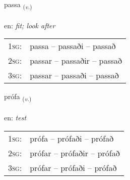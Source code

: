 \documentclass[frontgrid, backgrid]{flacards}\usepackage[]{graphicx}\usepackage[]{color}
\begin{document}
\renewcommand{\flhead}{\vskip5pt \fboxsep=0pt {\small\bfseries\footnotesize Sagnorð | Verb}}
\renewcommand{\fcfoot}{\vskip5pt \fboxsep=0pt \hspace{2pt}{\small\bfseries\footnotesize 2K}}

\renewcommand{\blhead}{\vskip5pt {\small\bfseries\footnotesize Sagnorð | Verb }}
\renewcommand{\bcfoot}{\vskip5pt \hspace{2pt}{\small\bfseries\footnotesize 2K}}


{passa \small{\textsubscript{(\textit{v.})}} \\[1ex] %
\textphonetic{[pʰasa]} \\
en: \emph{fit; look after} \\  [2ex]
\renewcommand*{\arraystretch}{0.8}
\begin{tabular}{p{1cm}l}
\textsc{1sg}: & passa -- passaði -- passað \\ 
\textsc{2sg}: & passar -- passaðir -- passað \\ 
\textsc{3sg}: & passar -- passaði -- passað \\ 
\end{tabular}
}

\renewcommand{\flhead}{\vskip5pt \fboxsep=0pt {\small\bfseries\footnotesize Sagnorð | Verb}}
\renewcommand{\fcfoot}{\vskip5pt \fboxsep=0pt \hspace{2pt}{\small\bfseries\footnotesize 2K}}

\renewcommand{\blhead}{\vskip5pt {\small\bfseries\footnotesize Sagnorð | Verb }}
\renewcommand{\bcfoot}{\vskip5pt \hspace{2pt}{\small\bfseries\footnotesize 2K}}


{prófa \small{\textsubscript{(\textit{v.})}} \\[1ex] %
\textphonetic{[pʰrouːva]} \\
en: \emph{test} \\  [2ex]
\renewcommand*{\arraystretch}{0.8}
\begin{tabular}{p{1cm}l}
\textsc{1sg}: & prófa -- prófaði -- prófað \\ 
\textsc{2sg}: & prófar -- prófaðir -- prófað \\ 
\textsc{3sg}: & prófar -- prófaði -- prófað \\ 
\end{tabular}
}
\end{document}
